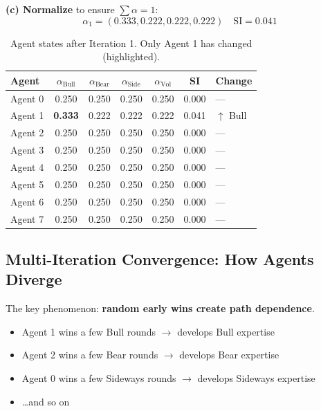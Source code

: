 \textbf{(c) Normalize} to ensure $\sum \alpha = 1$:
\begin{equation}
\alpha_1 = (0.333, 0.222, 0.222, 0.222) \quad \text{SI} = 0.041
\end{equation}

\begin{table}[h]
\centering
\small
\caption{Agent states after Iteration 1. Only Agent 1 has changed (highlighted).}
\begin{tabular}{l|cccc|c|l}
\toprule
\textbf{Agent} & $\alpha_{\text{Bull}}$ & $\alpha_{\text{Bear}}$ & $\alpha_{\text{Side}}$ & $\alpha_{\text{Vol}}$ & \textbf{SI} & \textbf{Change} \\
\midrule
Agent 0 & 0.250 & 0.250 & 0.250 & 0.250 & 0.000 & --- \\
\rowcolor{green!10} Agent 1 & \textbf{0.333} & 0.222 & 0.222 & 0.222 & 0.041 & $\uparrow$ Bull \\
Agent 2 & 0.250 & 0.250 & 0.250 & 0.250 & 0.000 & --- \\
Agent 3 & 0.250 & 0.250 & 0.250 & 0.250 & 0.000 & --- \\
Agent 4 & 0.250 & 0.250 & 0.250 & 0.250 & 0.000 & --- \\
Agent 5 & 0.250 & 0.250 & 0.250 & 0.250 & 0.000 & --- \\
Agent 6 & 0.250 & 0.250 & 0.250 & 0.250 & 0.000 & --- \\
Agent 7 & 0.250 & 0.250 & 0.250 & 0.250 & 0.000 & --- \\
\bottomrule
\end{tabular}
\end{table}


\subsection{Multi-Iteration Convergence: How Agents Diverge}

The key phenomenon: \textbf{random early wins create path dependence}.

\begin{itemize}
    \item Agent 1 wins a few Bull rounds $\to$ develops Bull expertise
    \item Agent 2 wins a few Bear rounds $\to$ develops Bear expertise
    \item Agent 0 wins a few Sideways rounds $\to$ develops Sideways expertise
    \item \ldots and so on
\end{itemize}

